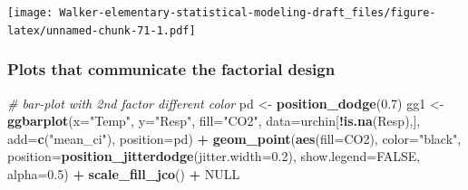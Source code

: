 \documentclass[]{book}
\newenvironment{Shaded}{\begin{snugshade}}{\end{snugshade}}
\newcommand{\KeywordTok}[1]{\textcolor[rgb]{0.13,0.29,0.53}{\textbf{#1}}}
\newcommand{\DataTypeTok}[1]{\textcolor[rgb]{0.13,0.29,0.53}{#1}}
\newcommand{\FloatTok}[1]{\textcolor[rgb]{0.00,0.00,0.81}{#1}}
\newcommand{\StringTok}[1]{\textcolor[rgb]{0.31,0.60,0.02}{#1}}
\newcommand{\CommentTok}[1]{\textcolor[rgb]{0.56,0.35,0.01}{\textit{#1}}}
\newcommand{\OtherTok}[1]{\textcolor[rgb]{0.56,0.35,0.01}{#1}}
\newcommand{\OperatorTok}[1]{\textcolor[rgb]{0.81,0.36,0.00}{\textbf{#1}}}
\newcommand{\NormalTok}[1]{#1}
\begin{document}
\texttt{[image: Walker-elementary-statistical-modeling-draft\_files/figure-latex/unnamed-chunk-71-1.pdf]}

\subsubsection{Plots that communicate the factorial
design}\label{plots-that-communicate-the-factorial-design}

\begin{Shaded}
\begin{Highlighting}[]
\CommentTok{# bar-plot with 2nd factor different color}
\NormalTok{pd <-}\StringTok{ }\KeywordTok{position_dodge}\NormalTok{(}\FloatTok{0.7}\NormalTok{)}
\NormalTok{gg1 <-}\StringTok{ }\KeywordTok{ggbarplot}\NormalTok{(}\DataTypeTok{x=}\StringTok{"Temp"}\NormalTok{,}
          \DataTypeTok{y=}\StringTok{"Resp"}\NormalTok{,}
          \DataTypeTok{fill=}\StringTok{"CO2"}\NormalTok{,}
          \DataTypeTok{data=}\NormalTok{urchin[}\OperatorTok{!}\KeywordTok{is.na}\NormalTok{(Resp),],}
          \DataTypeTok{add=}\KeywordTok{c}\NormalTok{(}\StringTok{"mean_ci"}\NormalTok{),}
          \DataTypeTok{position=}\NormalTok{pd) }\OperatorTok{+}
\StringTok{  }\KeywordTok{geom_point}\NormalTok{(}\KeywordTok{aes}\NormalTok{(}\DataTypeTok{fill=}\NormalTok{CO2), }
             \DataTypeTok{color=}\StringTok{"black"}\NormalTok{, }
             \DataTypeTok{position=}\KeywordTok{position_jitterdodge}\NormalTok{(}\DataTypeTok{jitter.width=}\FloatTok{0.2}\NormalTok{), }
             \DataTypeTok{show.legend=}\OtherTok{FALSE}\NormalTok{, }
             \DataTypeTok{alpha=}\FloatTok{0.5}\NormalTok{) }\OperatorTok{+}
\StringTok{  }\KeywordTok{scale_fill_jco}\NormalTok{() }\OperatorTok{+}
\StringTok{  }\OtherTok{NULL}


\end{Highlighting}
\end{Shaded}
\end{document}

